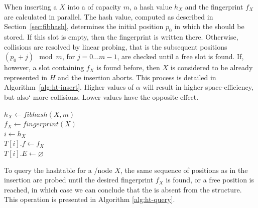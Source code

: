When inserting a \kmer $X$ into a \dBHT of capacity $m$, a hash value $h_X$ and the fingerprint $f_X$ are calculated in parallel. The hash value, computed as described in Section~\ref{sec:fibhash}, determines the initial position $p_0$ in which the \kmer should be stored. If this slot is empty, then the fingerprint is written there. Otherwise, collisions are resolved by linear probing, that is the subsequent positions $(p_0+j)\mod m$, for $j=0\ldots m-1$, are checked until a free slot is found. If, however, a slot containing $f_X$ is found before, then $X$ is considered to be already represented in $H$ and the insertion aborts. This process is detailed in Algorithm~\ref{alg:ht-insert}. 
 Higher values of $\alpha$ will result in higher space-efficiency, but also` more collisions. Lower values have the opposite effect. 


\begin{algorithm}
	\caption{$T.\mathit{insert}(X$)}\label{alg:ht-insert}
	$h_X \gets \mathit{fibhash}(X, m)$\\
	$f_X \gets \mathit{fingerprint}(X)$\\
	$i \gets h_X$\\
	$T[i].f\gets f_X$\\
	$T[i].E\gets \varnothing$\\
\end{algorithm}

To query the hashtable for a \kmer/node $X$, the same sequence of positions as in the insertion are probed until the desired fingerprint $f_X$ is found, or a free position is reached, in which case we can conclude that the \kmer is absent from the structure. This operation is presented in Algorithm \ref{alg:ht-query}.

